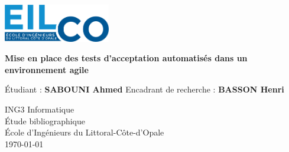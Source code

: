 \begin{titlepage}
    \begin{center}
      \includegraphics[width=0.35\textwidth]{logo.png}
        \vspace*{1.5cm}
        
        \Huge
        \textbf{Mise en place des tests d'acceptation automatisés dans un environnement agile}
        
        \vspace{0.5cm}
        \LARGE
        
        \vspace{1.5cm}
        
        Étudiant : \textbf{SABOUNI Ahmed}
        \linebreak
        Encadrant de recherche : \textbf{BASSON Henri}
         
   		  \vspace{1.5cm}
        
       
        \vfill
        
        ING3 Informatique\\
        
        \vspace{0.8cm}
          \Large
          Étude bibliographique\\
          École d'Ingénieurs du Littoral-Côte-d'Opale\\
      \today
        
    \end{center}
\end{titlepage}
